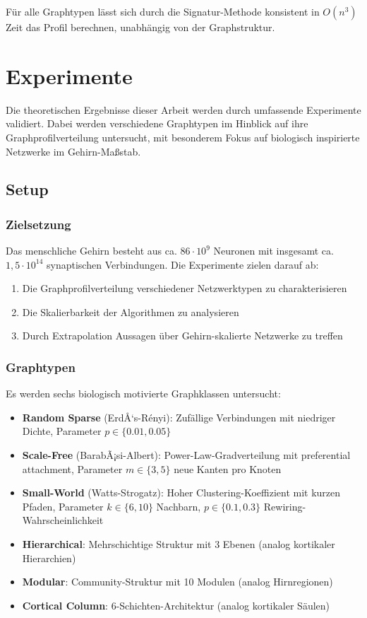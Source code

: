 ﻿\documentclass[a4paper,12pt]{article}
\theoremstyle{definition}
\begin{document}
	Für alle Graphtypen lässt sich durch die Signatur-Methode konsistent in $O(n^3)$ Zeit das Profil berechnen, unabhängig von der Graphstruktur.
	
	\section{Experimente}
	
	Die theoretischen Ergebnisse dieser Arbeit werden durch umfassende Experimente validiert. Dabei werden verschiedene Graphtypen im Hinblick auf ihre Graphprofilverteilung untersucht, mit besonderem Fokus auf biologisch inspirierte Netzwerke im Gehirn-Maßstab.
	
	\subsection{Setup}
	
	\subsubsection{Zielsetzung}
	
	Das menschliche Gehirn besteht aus ca. $86 \cdot 10^9$ Neuronen mit insgesamt ca. $1{,}5 \cdot 10^{14}$ synaptischen Verbindungen. Die Experimente zielen darauf ab:
	
	\begin{enumerate}
		\item Die Graphprofilverteilung verschiedener Netzwerktypen zu charakterisieren
		\item Die Skalierbarkeit der Algorithmen zu analysieren
		\item Durch Extrapolation Aussagen über Gehirn-skalierte Netzwerke zu treffen
	\end{enumerate}
	
	\subsubsection{Graphtypen}
	
	Es werden sechs biologisch motivierte Graphklassen untersucht:
	
	\begin{itemize}
		\item[-] \textbf{Random Sparse} (ErdÅ‘s-Rényi): Zufällige Verbindungen mit niedriger Dichte, Parameter $p \in \{0.01, 0.05\}$
		\item[-] \textbf{Scale-Free} (BarabÃ¡si-Albert): Power-Law-Gradverteilung mit preferential attachment, Parameter $m \in \{3, 5\}$ neue Kanten pro Knoten
		\item[-] \textbf{Small-World} (Watts-Strogatz): Hoher Clustering-Koeffizient mit kurzen Pfaden, Parameter $k \in \{6, 10\}$ Nachbarn, $p \in \{0.1, 0.3\}$ Rewiring-Wahrscheinlichkeit
		\item[-] \textbf{Hierarchical}: Mehrschichtige Struktur mit 3 Ebenen (analog kortikaler Hierarchien)
		\item[-] \textbf{Modular}: Community-Struktur mit 10 Modulen (analog Hirnregionen)
		\item[-] \textbf{Cortical Column}: 6-Schichten-Architektur (analog kortikaler Säulen)
	\end{itemize}
	
\end{document}
